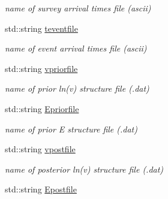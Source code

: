 \begin{DoxyCompactItemize}
\begin{DoxyCompactList}\small\item\em name of survey arrival times file (ascii) \end{DoxyCompactList}\item 
\hypertarget{class_parameters_ac333c359e83f8576d6e97731740d8a5c}{}std\+::string \hyperlink{class_parameters_ac333c359e83f8576d6e97731740d8a5c}{teventfile}\label{class_parameters_ac333c359e83f8576d6e97731740d8a5c}

\begin{DoxyCompactList}\small\item\em name of event arrival times file (ascii) \end{DoxyCompactList}\item 
\hypertarget{class_parameters_a841eafa3511c88d82e0abb19c5d61078}{}std\+::string \hyperlink{class_parameters_a841eafa3511c88d82e0abb19c5d61078}{vpriorfile}\label{class_parameters_a841eafa3511c88d82e0abb19c5d61078}

\begin{DoxyCompactList}\small\item\em name of prior ln(v) structure file (.dat) \end{DoxyCompactList}\item 
\hypertarget{class_parameters_a0b28754d62c18f739744589a018a3fd5}{}std\+::string \hyperlink{class_parameters_a0b28754d62c18f739744589a018a3fd5}{Epriorfile}\label{class_parameters_a0b28754d62c18f739744589a018a3fd5}

\begin{DoxyCompactList}\small\item\em name of prior E structure file (.dat) \end{DoxyCompactList}\item 
\hypertarget{class_parameters_ae8ed1b81af86ba0163851b3997469191}{}std\+::string \hyperlink{class_parameters_ae8ed1b81af86ba0163851b3997469191}{vpostfile}\label{class_parameters_ae8ed1b81af86ba0163851b3997469191}

\begin{DoxyCompactList}\small\item\em name of posterior ln(v) structure file (.dat) \end{DoxyCompactList}\item 
\hypertarget{class_parameters_aecbac99b3ffaba3d0095807e86573e6e}{}std\+::string \hyperlink{class_parameters_aecbac99b3ffaba3d0095807e86573e6e}{Epostfile}\label{class_parameters_aecbac99b3ffaba3d0095807e86573e6e}


\end{DoxyCompactItemize}
